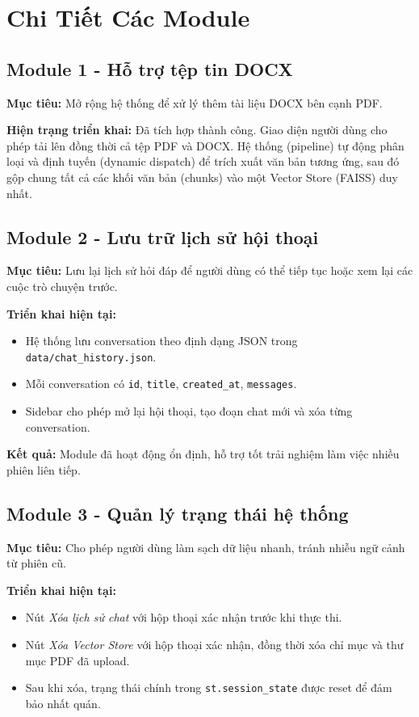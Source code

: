 \documentclass[conference]{IEEEtran}
\begin{document}
\section{Chi Tiết Các Module}

\subsection{Module 1 - Hỗ trợ tệp tin DOCX}
\textbf{Mục tiêu:} Mở rộng hệ thống để xử lý thêm tài liệu DOCX bên cạnh PDF.

\textbf{Hiện trạng triển khai:} Đã tích hợp thành công. Giao diện người dùng cho phép tải lên đồng thời cả tệp PDF và DOCX. Hệ thống (pipeline) tự động phân loại và định tuyến (dynamic dispatch) để trích xuất văn bản tương ứng, sau đó gộp chung tất cả các khối văn bản (chunks) vào một Vector Store (FAISS) duy nhất.

\subsection{Module 2 - Lưu trữ lịch sử hội thoại}
\textbf{Mục tiêu:} Lưu lại lịch sử hỏi đáp để người dùng có thể tiếp tục hoặc xem lại các cuộc trò chuyện trước.

\textbf{Triển khai hiện tại:}
\begin{itemize}
  \item Hệ thống lưu conversation theo định dạng JSON trong \texttt{data/chat\_history.json}.
  \item Mỗi conversation có \texttt{id}, \texttt{title}, \texttt{created\_at}, \texttt{messages}.
  \item Sidebar cho phép mở lại hội thoại, tạo đoạn chat mới và xóa từng conversation.
\end{itemize}

\textbf{Kết quả:} Module đã hoạt động ổn định, hỗ trợ tốt trải nghiệm làm việc nhiều phiên liên tiếp.

\subsection{Module 3 - Quản lý trạng thái hệ thống}
\textbf{Mục tiêu:} Cho phép người dùng làm sạch dữ liệu nhanh, tránh nhiễu ngữ cảnh từ phiên cũ.

\textbf{Triển khai hiện tại:}
\begin{itemize}
  \item Nút \textit{Xóa lịch sử chat} với hộp thoại xác nhận trước khi thực thi.
  \item Nút \textit{Xóa Vector Store} với hộp thoại xác nhận, đồng thời xóa chỉ mục và thư mục PDF đã upload.
  \item Sau khi xóa, trạng thái chính trong \texttt{st.session\_state} được reset để đảm bảo nhất quán.
\end{itemize}
\end{document}

